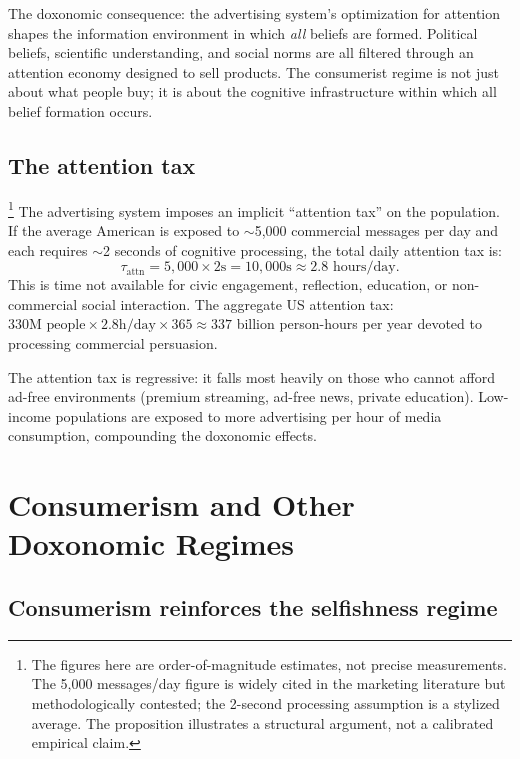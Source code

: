 The doxonomic consequence: the advertising system's optimization for attention shapes the information environment in which \emph{all} beliefs are formed.
Political beliefs, scientific understanding, and social norms are all filtered through an attention economy designed to sell products.
The consumerist regime is not just about what people buy; it is about the cognitive infrastructure within which all belief formation occurs.

\subsection{The attention tax}

\begin{proposition}\footnote{The figures here are order-of-magnitude estimates, not precise measurements. The 5,000 messages/day figure is widely cited in the marketing literature but methodologically contested; the 2-second processing assumption is a stylized average. The proposition illustrates a structural argument, not a calibrated empirical claim.}
\label{prop:attention-tax}
The advertising system imposes an implicit ``attention tax'' on the population.
If the average American is exposed to $\sim$5,000 commercial messages per day and each requires $\sim$2 seconds of cognitive processing, the total daily attention tax is:
\[
  \tau_{\text{attn}} = 5{,}000 \times 2\text{s} = 10{,}000\text{s} \approx 2.8 \text{ hours/day.}
\]
This is time not available for civic engagement, reflection, education, or non-commercial social interaction.
The aggregate US attention tax: $330\text{M people} \times 2.8\text{h/day} \times 365 \approx 337$ billion person-hours per year devoted to processing commercial persuasion.
\end{proposition}

The attention tax is regressive: it falls most heavily on those who cannot afford ad-free environments (premium streaming, ad-free news, private education).
Low-income populations are exposed to more advertising per hour of media consumption, compounding the doxonomic effects.

\section{Consumerism and Other Doxonomic Regimes}
\label{sec:ch23-political}

\subsection{Consumerism reinforces the selfishness regime}

